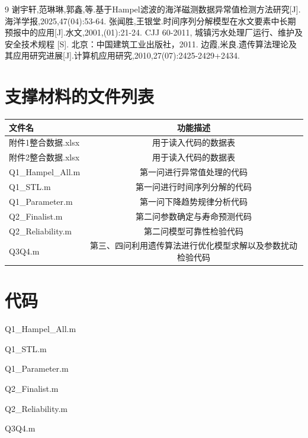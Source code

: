 \documentclass[withoutpreface,bwprint]{cumcmthesis}
\begin{document}

\newpage

\nocite{*}
\begin{thebibliography}{9}%
 谢宇轩,范琳琳,郭鑫,等.基于Hampel滤波的海洋磁测数据异常值检测方法研究[J].海洋学报,2025,47(04):53-64.
 张闻胜,王银堂.时间序列分解模型在水文要素中长期预报中的应用[J].水文,2001,(01):21-24.
 CJJ 60-2011, 城镇污水处理厂运行、维护及安全技术规程 [S]. 北京：中国建筑工业出版社，2011.
 边霞,米良.遗传算法理论及其应用研究进展[J].计算机应用研究,2010,27(07):2425-2429+2434.
\end{thebibliography}
\begin{appendices}
\section{支撑材料的文件列表}
\begin{table}[H]
	\centering
	\setlength{\tabcolsep}{6pt}
	\renewcommand{\arraystretch}{1.5}
	\label{tab:支撑材料}
	\begin{tabular}{lc}
		\toprule
		\textbf{文件名} & \textbf{功能描述} \\
		\midrule
		\rowcolor{LightBlue}
		附件1整合数据.xlsx & 用于读入代码的数据表 \\
		附件2整合数据.xlsx & 用于读入代码的数据表 \\
		\rowcolor{LightBlue}
		Q1\_Hampel\_All.m & 第一问进行异常值处理的代码 \\
		Q1\_STL.m & 第一问进行时间序列分解的代码 \\
		\rowcolor{LightBlue}
		Q1\_Parameter.m & 第一问下降趋势规律分析代码 \\
		Q2\_Finalist.m & 第二问参数确定与寿命预测代码 \\
		\rowcolor{LightBlue}
		Q2\_Reliability.m & 第二问模型可靠性检验代码 \\
		Q3Q4.m & 第三、四问利用遗传算法进行优化模型求解以及参数扰动检验代码 \\
		\bottomrule
	\end{tabular}
\end{table}

\section{代码}
\noindent Q1\_Hampel\_All.m


\noindent Q1\_STL.m


\noindent Q1\_Parameter.m


\noindent Q2\_Finalist.m


\noindent Q2\_Reliability.m


\noindent Q3Q4.m

\end{appendices}
\end{document}
